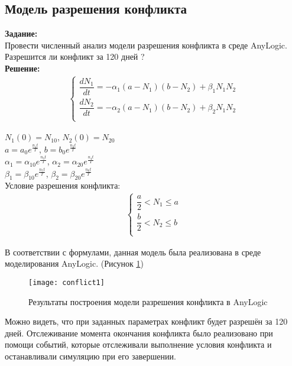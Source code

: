 \subsection*{Модель разрешения конфликта}

\textbf{Задание:}\\
Провести численный анализ модели разрешения конфликта в среде AnyLogic. Разрешится ли конфликт за 120 дней ?\\

\textbf{Решение:}
\begin{align*}
	\begin{cases}
		\dfrac{dN_1}{dt} = - \alpha_1 (a - N_1) (b - N_2) + \beta_1 N_1 N_2\\[10pt]
		\dfrac{dN_2}{dt} = - \alpha_2 (a - N_1) (b - N_2) + \beta_2 N_1 N_2\\
	\end{cases}
\end{align*}

$N_1(0) = N_{10}$, $N_2(0) = N_{20}$\\
$a = a_0 e^{\frac{n_1 t}{T}}$, $b = b_0 e^{\frac{n_2 t}{T}}$\\
$\alpha_1 = \alpha_{10} e^{\frac{n_3 t}{T}}$, $\alpha_2 = \alpha_{20} e^{\frac{n_4 t}{T}}$\\
$\beta_1 = \beta_{10} e^{\frac{n_5 t}{T}}$, $\beta_2 = \beta_{20} e^{\frac{n_6 t}{T}}$\\

Условие разрешения конфликта:
\begin{align*}
	\begin{cases}
		\dfrac{a}{2} < N_1 \leq a\\[10pt]
		\dfrac{b}{2} < N_2 \leq b\\
	\end{cases}
\end{align*}

В соответствии с формулами, данная модель была реализована в среде моделирования AnyLogic. (Рисунок \ref{fig:conflict1})
\begin{figure}[h]
	\centering \texttt{[image: conflict1]}
	\caption{Результаты построения модели разрешения конфликта в AnyLogic}
	\label{fig:conflict1}
\end{figure}

Можно видеть, что при заданных параметрах конфликт будет разрешён за 120 дней. Отслеживание момента окончания
конфликта было реализовано при помощи событий, которые отслеживали выполнение условия конфликта и останавливали симуляцию при его завершении.\\

